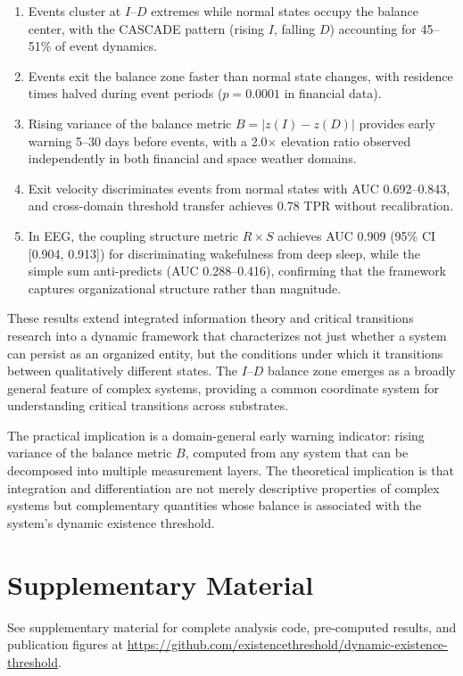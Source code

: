 \documentclass[aip,cha,reprint,amsmath,amssymb]{revtex4-2}
\begin{document}
\begin{enumerate}
\item Events cluster at $I$--$D$ extremes while normal states occupy the balance center, with the CASCADE pattern (rising $I$, falling $D$) accounting for 45--51\% of event dynamics.
\item Events exit the balance zone faster than normal state changes, with residence times halved during event periods ($p = 0.0001$ in financial data).
\item Rising variance of the balance metric $B = |z(I) - z(D)|$ provides early warning 5--30 days before events, with a 2.0$\times$ elevation ratio observed independently in both financial and space weather domains.
\item Exit velocity discriminates events from normal states with AUC 0.692--0.843, and cross-domain threshold transfer achieves 0.78 TPR without recalibration.
\item In EEG, the coupling structure metric $R \times S$ achieves AUC 0.909 (95\% CI [0.904, 0.913]) for discriminating wakefulness from deep sleep, while the simple sum anti-predicts (AUC 0.288--0.416), confirming that the framework captures organizational structure rather than magnitude.
\end{enumerate}

These results extend integrated information theory and critical transitions research into a dynamic framework that characterizes not just whether a system can persist as an organized entity, but the conditions under which it transitions between qualitatively different states. The $I$--$D$ balance zone emerges as a broadly general feature of complex systems, providing a common coordinate system for understanding critical transitions across substrates.

The practical implication is a domain-general early warning indicator: rising variance of the balance metric $B$, computed from any system that can be decomposed into multiple measurement layers. The theoretical implication is that integration and differentiation are not merely descriptive properties of complex systems but complementary quantities whose balance is associated with the system's dynamic existence threshold.


\section*{Supplementary Material}

See supplementary material for complete analysis code, pre-computed results, and publication figures at \url{https://github.com/existencethreshold/dynamic-existence-threshold}.
\end{document}
